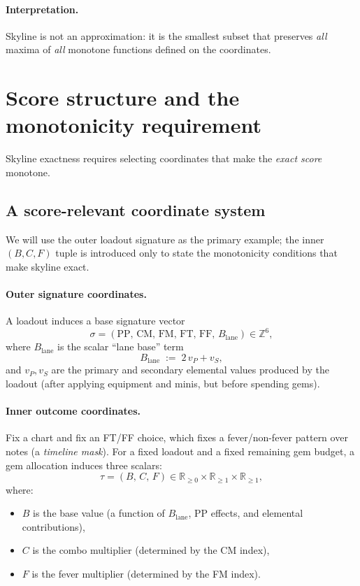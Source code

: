 \documentclass[11pt]{article}
\theoremstyle{plain}
\begin{document}
\paragraph{Interpretation.} Skyline is not an approximation: it is the smallest subset that preserves \emph{all} maxima of \emph{all} monotone functions defined on the coordinates.

\section{Score structure and the monotonicity requirement}
Skyline exactness requires selecting coordinates that make the \emph{exact score} monotone.

\subsection{A score-relevant coordinate system}
We will use the outer loadout signature as the primary example; the inner $(B, C, F)$ tuple is introduced only to state the monotonicity conditions that make skyline exact.

\paragraph{Outer signature coordinates.}
A loadout induces a base signature vector
\[
\sigma = (\mathrm{PP},\,\mathrm{CM},\,\mathrm{FM},\,\mathrm{FT},\,\mathrm{FF},\,B_{\mathrm{lane}})\in\mathbb{Z}^6,
\]
where $B_{\mathrm{lane}}$ is the scalar ``lane base'' term
\[
B_{\mathrm{lane}} \;:=\; 2\,v_P + v_S,
\]
and $v_P,v_S$ are the primary and secondary elemental values produced by the loadout (after applying equipment and minis, but before spending gems).

\paragraph{Inner outcome coordinates.}
Fix a chart and fix an FT/FF choice, which fixes a fever/non-fever pattern over notes (a \emph{timeline mask}). For a fixed loadout and a fixed remaining gem budget, a gem allocation induces three scalars:
\[
\tau = (B,\,C,\,F)\in\mathbb{R}_{\ge 0}\times\mathbb{R}_{\ge 1}\times\mathbb{R}_{\ge 1},
\]
where:
\begin{itemize}
  \item $B$ is the base value (a function of $B_{\mathrm{lane}}$, PP effects, and elemental contributions),
  \item $C$ is the combo multiplier (determined by the CM index),
  \item $F$ is the fever multiplier (determined by the FM index).
\end{itemize}
\end{document}
